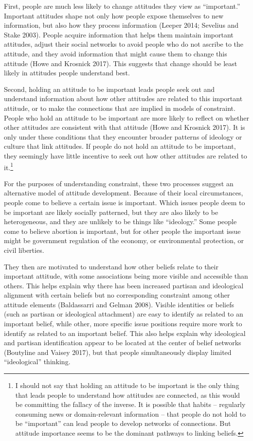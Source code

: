 \documentclass[12pt,]{article}
\begin{document}
First, people are much less likely to change attitudes they view as ``important.'' Important attitudes shape not only how people expose themselves to new information, but also how they process information (Leeper 2014; Sevelius and Stake 2003). People acquire information that helps them maintain important attitudes, adjust their social networks to avoid people who do not ascribe to the attitude, and they avoid information that might cause them to change this attitude (Howe and Krosnick 2017). This suggests that change should be least likely in attitudes people understand best.

Second, holding an attitude to be important leads people seek out and understand information about how other attitudes are related to this important attitude, or to make the connections that are implied in models of constraint. People who hold an attitude to be important are more likely to reflect on whether other attitudes are consistent with that attitude (Howe and Krosnick 2017). It is only under these conditions that they encounter broader patterns of ideology or culture that link attitudes. If people do not hold an attitude to be important, they seemingly have little incentive to seek out how other attitudes are related to it.\footnote{I should not say that holding an attitude to be important is the only thing that leads people to understand how attitudes are connected, as this would be committing the fallacy of the inverse. It is possible that habits -- regularly consuming news or domain-relevant information -- that people do not hold to be ``important'' can lead people to develop networks of connections. But attitude importance seems to be the dominant pathways to linking beliefs.}

For the purposes of understanding constraint, these two processes suggest an alternative model of attitude development. Because of their local circumstances, people come to believe a certain issue is important. Which issues people deem to be important are likely socially patterned, but they are also likely to be heterogeneous, and they are unlikely to be things like ``ideology.'' Some people come to believe abortion is important, but for other people the important issue might be government regulation of the economy, or environmental protection, or civil liberties.

They then are motivated to understand how other beliefs relate to their important attitude, with some associations being more visible and accessible than others. This helps explain why there has been increased partisan and ideological alignment with certain beliefs but no corresponding constraint among other attitude elements (Baldassarri and Gelman 2008). Visible identities or beliefs (such as partisan or ideological attachment) are easy to identify as related to an important belief, while other, more specific issue positions require more work to identify as related to an important belief. This also helps explain why ideological and partisan identification appear to be located at the center of belief networks (Boutyline and Vaisey 2017), but that people simultaneously display limited ``ideological'' thinking.
\end{document}
